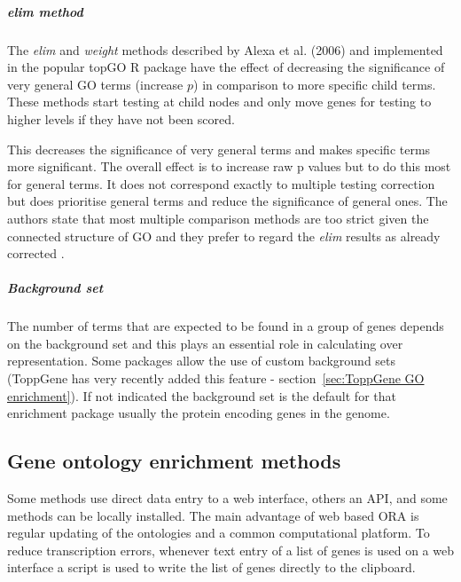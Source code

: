 

\subparagraph{elim method}
The \textit{elim} and \textit{weight} methods described by Alexa et al. (2006)   \cite{alexa2006improved} and implemented in the popular topGO R  package\cite{alexa2009gene} have the effect of decreasing the significance of very general GO terms (increase $p$) in comparison to more specific child terms. These methods start testing at child nodes and only move genes for testing to higher levels if they have not been scored. 

This decreases the significance of very general terms and makes specific terms more significant. The overall effect is to increase raw p values but to do this most for general terms. It does not correspond exactly to multiple testing correction but does prioritise general terms and reduce the significance of general ones. The authors state that most multiple comparison methods are too strict given the connected structure of GO and they prefer to regard the \textit{elim} results as already corrected \cite{alexa2020gene}.

\subparagraph{Background set}
The number of terms that are expected to be found in a group of genes depends on the background set and this plays an essential role in calculating over representation. Some packages allow the use of custom background sets (ToppGene has very recently added this feature  - section~\ref{sec:ToppGene GO enrichment}). If not indicated the background set is the default for that enrichment package usually the protein encoding genes in the genome.  

\subsection{Gene ontology enrichment methods}
\label{sec:GO enrichment methods}
Some methods use direct data entry to a web interface, others an API, and some methods can be locally installed. The main advantage of web based ORA is regular updating of the ontologies and a common computational platform. To reduce transcription errors, whenever text entry of a list of genes is used on a web interface a script is used to write the list of genes directly to the clipboard.

